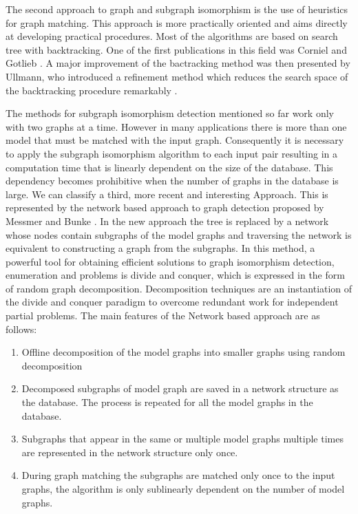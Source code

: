 The second approach to graph and subgraph isomorphism is the use of heuristics for graph matching. This approach is  more practically oriented and aims 
directly at developing practical procedures. Most of the algorithms are based on search tree with backtracking. One of the first publications in this 
field was Corniel and Gotlieb \cite{corneil1970}. A major improvement of the bactracking method was then presented by Ullmann, who introduced  a refinement 
method which reduces the search space of the backtracking procedure remarkably \cite{ullmann1976}.

The methods for subgraph isomorphism  detection mentioned so far work only with two graphs at a time. However in many applications there is more than 
one model that must be matched with the input graph. Consequently it is necessary to apply the subgraph isomorphism algorithm to each input pair 
resulting in a computation time that is linearly dependent on the size of the database. This dependency becomes prohibitive when the number of graphs 
in the database is large.  
We can classify a third, more recent and interesting  Approach. This is represented by the network based approach to graph detection proposed by Messmer and  Bunke
\cite{messmer_bunke2000} . In the new approach the tree is replaced by a network whose nodes contain subgraphs of the model graphs and traversing the 
network is equivalent to constructing a graph from the subgraphs. In this method, a powerful tool for obtaining efficient solutions to graph isomorphism 
detection, enumeration  and  problems is divide and conquer, which is expressed in the form of random graph decomposition. Decomposition techniques are 
an instantiation of the divide and conquer paradigm to overcome redundant work for independent partial problems. The main features of the Network based 
approach are as follows:

\begin{enumerate}
\item Offline decomposition of the model graphs into smaller graphs using  random decomposition
\item Decomposed subgraphs of model graph are saved in a network structure as the database. The process is repeated for all the model graphs in the database.
\item Subgraphs that appear in the same or multiple model graphs multiple times are represented in the network structure only once.
\item During graph matching the subgraphs are matched only once to the input graphs, the algorithm is only sublinearly dependent on the number of model graphs.
\end{enumerate}

